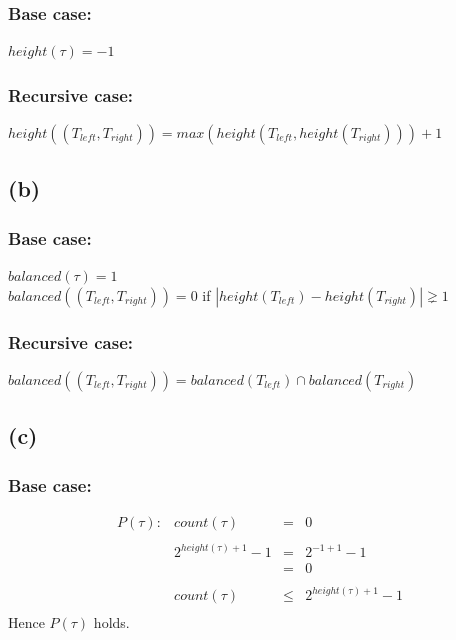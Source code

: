 \documentclass{article} %
\begin{document}
\subsubsection*{Base case:}
$height(\tau) = -1$
\subsubsection*{Recursive case:}
$height((T_{left}, T_{right})) = max(height(T_{left}, height(T_{right}))) + 1$

\subsection*{(b)}
\subsubsection*{Base case:}
$balanced(\tau) = 1$\\
$balanced((T_{left}, T_{right})) = 0$ if $\left| height(T_{left})-height(T_{right})\right|\gneq 1$
\subsubsection*{Recursive case:}
$balanced((T_{left}, T_{right})) = balanced(T_{left}) \cap balanced(T_{right})$
\subsection*{(c)}
\subsubsection*{Base case:}
\[\begin{array}{lrll}
    P(\tau):& count(\tau) &=& 0\\
    \\
            & 2^{height(\tau) + 1}-1 &=& 2^{-1+1}-1\\
                                    &&=& 0\\
                                    \\
            &   count(\tau) &\leq& 2^{height(\tau) + 1}-1\\
\end{array}\]
Hence $P(\tau)$ holds.\\
\end{document}
